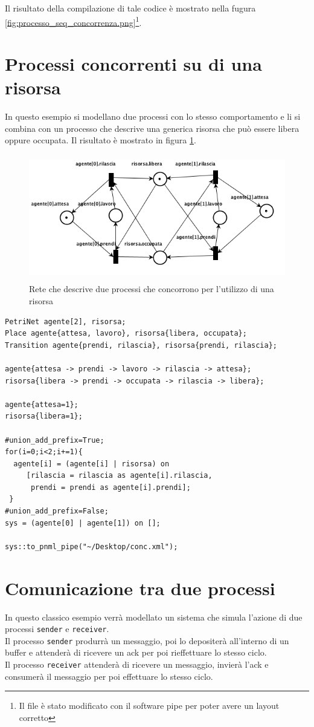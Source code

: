 \documentclass[italian,12pt]{book}
\begin{document}
Il risultato della compilazione di tale codice è mostrato nella fugura \ref{fig:processo_seq_concorrenza.png}\footnote{Il file è stato modificato con il software pipe per poter avere un layout corretto}.

\section{Processi concorrenti su di una risorsa}
In questo esempio si modellano due processi con lo stesso comportamento e li si combina con un processo che descrive una generica risorsa che può essere libera oppure occupata. Il risultato è mostrato in figura \ref{fig:processi_concorrenti_su_risorsa.png}.
\begin{figure}[htb]
\centerline{\includegraphics[height=5.5cm]{img/processi_concorrenti_su_risorsa.png}}
\caption{Rete che descrive due processi che concorrono per l'utilizzo di una risorsa}\label{fig:processi_concorrenti_su_risorsa.png}
\end{figure}

\begin{verbatim}PetriNet agente[2], risorsa;
Place agente{attesa, lavoro}, risorsa{libera, occupata};
Transition agente{prendi, rilascia}, risorsa{prendi, rilascia};

agente{attesa -> prendi -> lavoro -> rilascia -> attesa};
risorsa{libera -> prendi -> occupata -> rilascia -> libera};

agente{attesa=1};
risorsa{libera=1};

#union_add_prefix=True;
for(i=0;i<2;i+=1){
  agente[i] = (agente[i] | risorsa) on 
     [rilascia = rilascia as agente[i].rilascia, 
      prendi = prendi as agente[i].prendi];
 }
#union_add_prefix=False;
sys = (agente[0] | agente[1]) on [];

sys::to_pnml_pipe("~/Desktop/conc.xml");
\end{verbatim}

\section{Comunicazione tra due processi}
In questo classico esempio verrà modellato un sistema che simula l'azione di due processi {\tt sender} e {\tt receiver}.\\
Il processo {\tt sender} produrrà un messaggio, poi lo depositerà all'interno di un buffer e attenderà di ricevere un ack per poi rieffettuare lo stesso ciclo.\\
Il processo {\tt receiver} attenderà di ricevere un messaggio, invierà l'ack e consumerà il messaggio per poi effettuare lo stesso ciclo.\\
\end{document}
